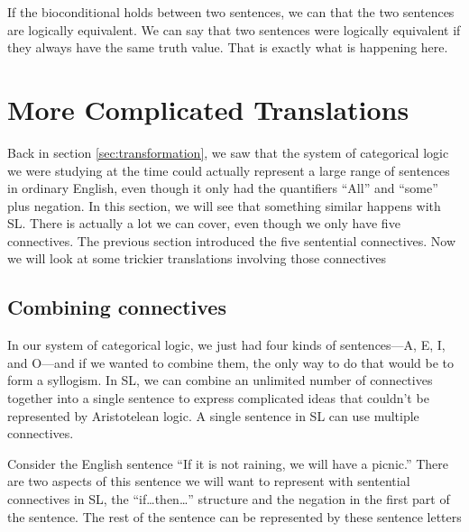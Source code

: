 If the bioconditional holds between two sentences, we can that the two sentences are logically equivalent. We can say that two sentences were logically equivalent if they always  have the same truth value. That is exactly what is happening here. 



\section{More Complicated Translations}

{Back in section \ref{sec:transformation}, we saw that the system of categorical logic we were studying at the time could actually represent a large range of sentences in ordinary English, even though it only had the quantifiers ``All'' and ``some'' plus negation. In this section, we will see that something similar happens with SL. There is actually a lot we can cover, even though we only have five connectives. }%
{The previous section introduced the five sentential connectives. Now we will look at some trickier translations involving those connectives}%


\subsection{Combining connectives}

{In our system of categorical logic, we just had four kinds of sentences---A, E, I, and O---and if we wanted to combine them, the only way to do that would be to form a syllogism. In SL, we can combine an unlimited number of connectives together into a single sentence to express complicated ideas that couldn't be represented by Aristotelean logic. }%
{A single sentence in SL can use multiple connectives.} %

Consider the English sentence ``If it is not raining, we will have a picnic.'' There are two aspects of this sentence we will want to represent with sentential connectives in SL, the ``if\ldots then\ldots'' structure and the negation in the first part of the sentence. The rest of the sentence can be represented by these sentence letters

